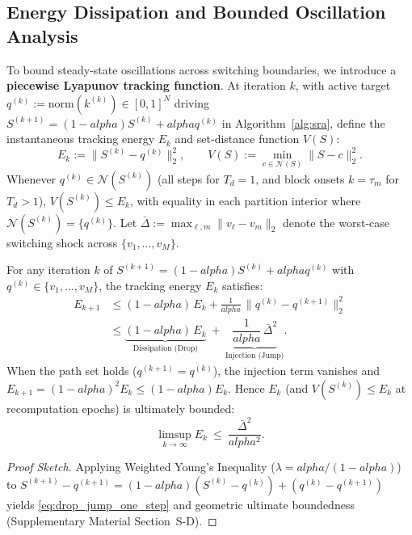 \documentclass{ccjnl}
\newcommand{\rev}[1]{{\color{blue}#1}}
\def\rev#1{#1}%
\def\kappa{k}%
\def\alpha{alpha}%
\begin{document}
\subsection{Energy Dissipation and Bounded Oscillation Analysis}
\label{subsec:lyapunov}

To bound steady-state oscillations across switching boundaries, we introduce a \textbf{piecewise Lyapunov tracking function}.
\rev{At iteration $k$, with active target $q^{(k)} := \mathrm{norm}(\kappa^{(k)}) \in [0,1]^N$ driving $S^{(k+1)} = (1-\alpha)S^{(k)} + \alpha q^{(k)}$ in Algorithm~\ref{alg:sra}, define the instantaneous tracking energy $E_k$ and set-distance function $V(S)$:}
\begin{equation}\label{eq:lyapunov_def}
E_k := \|S^{(k)} - q^{(k)}\|_2^2, \qquad V(S) := \min_{c\in\mathcal N(S)}\|S-c\|_2^2.
\end{equation}
\rev{Whenever $q^{(k)} \in \mathcal{N}(S^{(k)})$ (all steps for $T_d=1$, and block onsets $k=\tau_m$ for $T_d>1$), $V(S^{(k)}) \le E_k$, with equality in each partition interior where $\mathcal{N}(S^{(k)}) = \{q^{(k)}\}$.}
Let $\bar{\Delta} := \max_{\ell, m} \|v_\ell - v_m\|_2$ denote the worst-case switching shock across $\{v_1, \dots, v_M\}$.

\begin{theorem}
\label{thm:drop_jump}
\rev{For any iteration $k$ of $S^{(k+1)} = (1-\alpha)S^{(k)} + \alpha q^{(k)}$ with $q^{(k)} \in \{v_1, \dots, v_M\}$, the tracking energy $E_k$ satisfies:
\begin{equation}\label{eq:drop_jump_one_step}
\begin{aligned}
E_{k+1} &\le (1-\alpha)\,E_k + \frac{1}{\alpha}\,\|q^{(k)} - q^{(k+1)}\|_2^2 \\
&\le \underbrace{(1-\alpha)\,E_k}_{\text{Dissipation (Drop)}}\ +\ \underbrace{\dfrac{1}{\alpha}\,\bar\Delta^{2}}_{\text{Injection (Jump)}}.
\end{aligned}
\end{equation}
When the path set holds ($q^{(k+1)} = q^{(k)}$), the injection term vanishes and $E_{k+1} = (1-\alpha)^2 E_k \le (1-\alpha) E_k$. Hence $E_k$ (and $V(S^{(k)}) \le E_k$ at recomputation epochs) is ultimately bounded:}
\begin{equation}\label{eq:limsup_boundedness}
\rev{\limsup_{k\to\infty} E_k\ \le\ \frac{\bar\Delta^{2}}{\alpha^2}.}
\end{equation}
\end{theorem}
\begin{proof}[Proof Sketch]
Applying Weighted Young's Inequality ($\lambda = \alpha/(1-\alpha)$) to $S^{(k+1)} - q^{(k+1)} = (1-\alpha)(S^{(k)} - q^{(k)}) + (q^{(k)} - q^{(k+1)})$ yields \eqref{eq:drop_jump_one_step} and geometric ultimate boundedness (Supplementary Material Section~S-D).
\end{proof}
\end{document}
